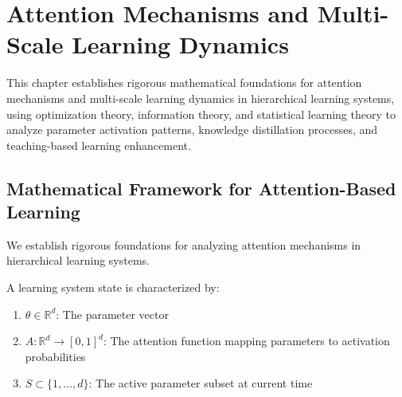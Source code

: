 \chapter{Attention Mechanisms and Multi-Scale Learning Dynamics}

\begin{tcolorbox}[colback=DarkSkyBlue!5!white,colframe=DarkSkyBlue!75!black,title=Chapter Summary]
This chapter establishes rigorous mathematical foundations for attention mechanisms and multi-scale learning dynamics in hierarchical learning systems, using optimization theory, information theory, and statistical learning theory to analyze parameter activation patterns, knowledge distillation processes, and teaching-based learning enhancement.
\end{tcolorbox}

\section{Mathematical Framework for Attention-Based Learning}

We establish rigorous foundations for analyzing attention mechanisms in hierarchical learning systems.

\begin{definition}
\label{def:learning_state}
A learning system state is characterized by:
\begin{enumerate}
\item $\theta \in \mathbb{R}^d$: The parameter vector
\item $A: \mathbb{R}^d \to [0,1]^d$: The attention function mapping parameters to activation probabilities
\item $S \subset \{1, \ldots, d\}$: The active parameter subset at current time
\end{enumerate}
\end{definition}

